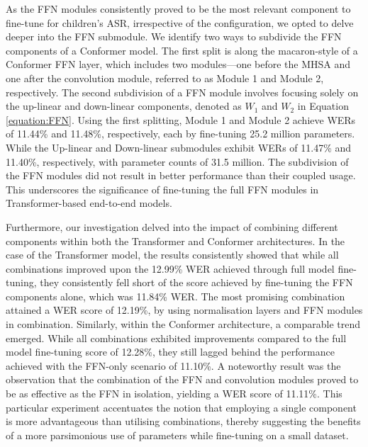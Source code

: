 
As the \ac{FFN} modules consistently proved to be the most relevant component to fine-tune for children's \ac{ASR}, irrespective of the configuration, we opted to delve deeper into the \ac{FFN} submodule. We identify two ways to subdivide the \ac{FFN} components of a Conformer model. The first split is along the macaron-style of a Conformer \ac{FFN} layer, which includes two modules—one before the \ac{MHSA} and one after the convolution module, referred to as Module 1 and Module 2, respectively. The second subdivision of a \ac{FFN} module involves focusing solely on the up-linear and down-linear components, denoted as $W_1$ and $W_2$ in Equation \ref{equation:FFN}. Using the first splitting, Module 1 and Module 2 achieve \acp{WER} of 11.44\% and 11.48\%, respectively, each by fine-tuning 25.2 million parameters. While the Up-linear and Down-linear submodules exhibit \acp{WER} of 11.47\% and 11.40\%, respectively, with parameter counts of 31.5 million. The subdivision of the \ac{FFN} modules did not result in better performance than their coupled usage. This underscores the significance of fine-tuning the full \ac{FFN} modules in Transformer-based end-to-end models.

Furthermore, our investigation delved into the impact of combining different components within both the Transformer and Conformer architectures. In the case of the Transformer model, the results consistently showed that while all combinations improved upon the 12.99\% \ac{WER} achieved through full model fine-tuning, they consistently fell short of the score achieved by fine-tuning the \ac{FFN} components alone, which was 11.84\% \ac{WER}. The most promising combination attained a \ac{WER} score of 12.19\%, by using normalisation layers and \ac{FFN} modules in combination.
Similarly, within the Conformer architecture, a comparable trend emerged. While all combinations exhibited improvements compared to the full model fine-tuning score of 12.28\%, they still lagged behind the performance achieved with the \ac{FFN}-only scenario of 11.10\%. A noteworthy result was the observation that the combination of the \ac{FFN} and convolution modules proved to be as effective as the \ac{FFN} in isolation, yielding a \ac{WER} score of 11.11\%. This particular experiment accentuates the notion that employing a single component is more advantageous than utilising combinations, thereby suggesting the benefits of a more parsimonious use of parameters while fine-tuning on a small dataset.

